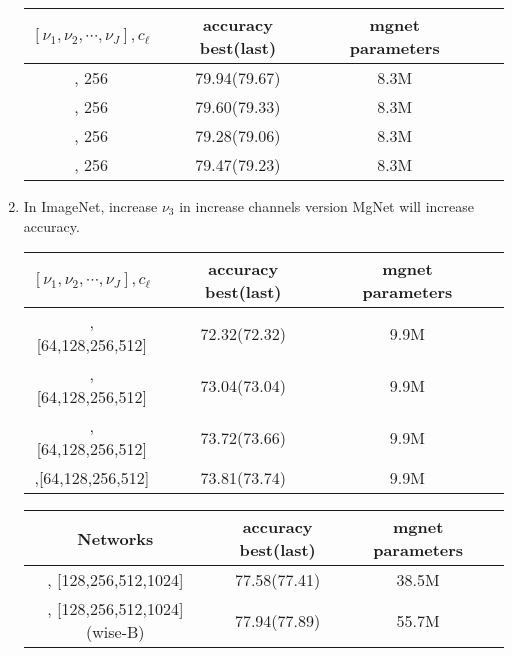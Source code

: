 \begin{enumerate}
\begin{table}[!htbp]
	\begin{center}
			\begin{tabular}{|c|c|c|c|c|}
				\hline
                $[\nu_1,\nu_2,\cdots,\nu_J], c_\ell$   &  accuracy best(last)  & mgnet parameters \tabularnewline
				\hline
				[2,2,2,2], 256                         &  79.94(79.67)         &     8.3M         \tabularnewline
				\hline		
				[2,2,2,4], 256                         &  79.60(79.33)         &     8.3M         \tabularnewline
				\hline
				[2,2,2,8], 256                         &  79.28(79.06)         &     8.3M         \tabularnewline
				\hline
				[2,2,2,16], 256                        &  79.47(79.23)         &     8.3M         \tabularnewline
				\hline
			\end{tabular}
	\end{center}
\end{table}

\newpage
\item In ImageNet, increase $\nu_3$ in increase channels  version MgNet will increase accuracy.
\begin{table}[!htbp]
	\begin{center}
			\begin{tabular}{|c|c|c|c|}
                \hline
				$[\nu_1,\nu_2,\cdots,\nu_J], c_\ell$   &  accuracy best(last)  & mgnet parameters \tabularnewline
				\hline
				[2,2,2,2], [64,128,256,512]            &  72.32(72.32)         &     9.9M         \tabularnewline
				\hline		
				[2,2,4,2], [64,128,256,512]            &  73.04(73.04)         &     9.9M         \tabularnewline
				\hline
				[2,2,8,2], [64,128,256,512]            &  73.72(73.66)         &     9.9M         \tabularnewline
				\hline
				[2,2,16,2],[64,128,256,512]            &  73.81(73.74)         &     9.9M         \tabularnewline
				\hline
			\end{tabular}
	\end{center}
\end{table}

\begin{table}[!htbp]
	\begin{center}
			\begin{tabular}{|c|c|c|c|}
                \hline
				Networks                                 &  accuracy best(last)  & mgnet parameters \tabularnewline
				\hline
				[2,2,4,2], [128,256,512,1024]            &  77.58(77.41)         &     38.5M         \tabularnewline
				\hline		
				[2,2,4,2], [128,256,512,1024](wise-B)    &  77.94(77.89)         &     55.7M        \tabularnewline
				\hline
			\end{tabular}
	\end{center}
\end{table}

\end{enumerate}


